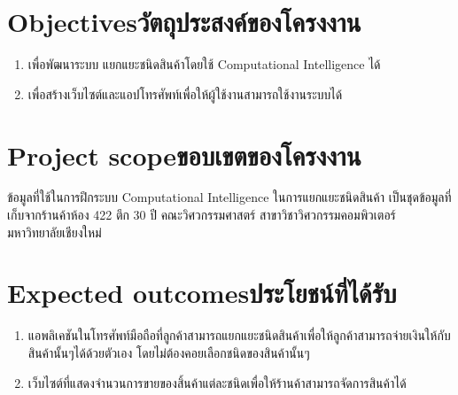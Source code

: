 \section{\ifenglish Objectives\else วัตถุประสงค์ของโครงงาน\fi}
\begin{enumerate}
    \item เพื่อพัฒนาระบบ แยกแยะชนิดสินค้าโดยใช้ Computational Intelligence ได้
    \item เพื่อสร้างเว็บไซต์และแอปโทรศัพท์เพื่อให้ผู้ใช้งานสามารถใช้งานระบบได้
\end{enumerate}

\section{\ifenglish Project scope\else ขอบเขตของโครงงาน\fi}
ข้อมูลที่ใช้ในการฝึกระบบ Computational Intelligence ในการแยกแยะชนิดสินค้า
เป็นชุดข้อมูลที่เก็บจากร้านค้าห้อง 422 ตึก 30 ปี คณะวิศวกรรมศาสตร์ สาขาวิชาวิศวกรรมคอมพิวเตอร์ มหาวิทยาลัยเชียงใหม่  


\section{\ifenglish Expected outcomes\else ประโยชน์ที่ได้รับ\fi}
\begin{enumerate}
    \item แอพลิเคชันในโทรศัพท์มือถือที่ลูกค้าสามารถแยกแยะชนิดสินค้าเพื่อให้ลูกค้าสามารถจ่ายเงินให้กับสินค้านั้นๆได้ด้วยตัวเอง โดยไม่ต้องคอยเลือกชนิดของสินค้านั้นๆ
    \item เว็บไซต์ที่แสดงจำนวนการขายของสิ้นค้าแต่ละชนิดเพื่อให้ร้านค้าสามารถจัดการสินค้าได้
\end{enumerate}
